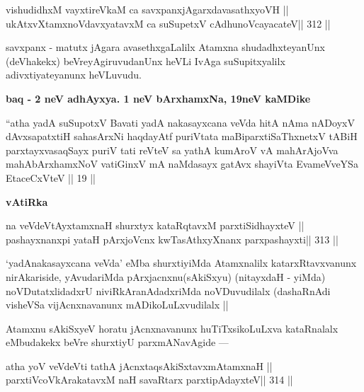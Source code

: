\begin{shl}
vishudidhxM vayxtireVkaM ca savxpanxjAgarxdavasathxyoVH ||
ukAtxvX\s\s tamxnoV\s davxyatavxM ca suSupetxV cAdhunoVcayacateV\hfill || 312 ||
\end{shl}

\begin{artha}
savxpanx - matutx jAgara avasethxgaLalilx Atamxna shudadhxteyanUnx (deVhakekx) beVreyAgiruvudanUnx heVLi IvAga suSupitxyalilx adivxtiyateyanunx heVLuvudu.
\end{artha}

\begin{center}
{\large\bf baq - 2 neV adhAyxya. 1 neV bArxhamxNa, 19neV kaMDike}
\end{center}

\begin{shl}
``atha yadA suSupotxV Bavati yadA nakasayxcana veVda
hitA nAma nADoyxV dAvxsapatxtiH sahasArxNi haqdayAtf
puriVtata maBiparxtiSaThxnetxV tABiH parxtayxvasaqSayx puriV
tati reVteV sa yathA kumAroV vA mahArAjoVva 
mahAbArxhamxNoV va\s tiGinxV mA naMdasayx gatAvx shayiVta 
EvameVveYSa EtaceCxVteV || 19 ||
\end{shl}

\begin{center}
{\large\bf vAtiRka}
\end{center}

\begin{shl}
na veVdeVtAyxtamxnaH shurxtyx kataRqtavxM parxtiSidhayxteV ||
pashayxnanxpi yataH pArxjoVcnx kwTasAthxyXnanx parxpashayxti\hfill || 313 ||
\end{shl}

\begin{artha}
`yadAnakasayxcana veVda' eMba shurxtiyiMda Atamxnalilx katarxRtavxvanunx nirAkariside, yAvudariMda pArxjacnxnu(sAkiSxyu) (nitayxdaH - yiMda) noVDutatxlidadxrU niviRkAranAdadxriMda noVDuvudilalx (dashaRnAdi visheVSa vijAcnxnavanunx mADikoLuLxvudilalx ||
\end{artha}

\begin{artha}
Atamxnu sAkiSxyeV horatu jAcnxnavanunx huTiTxsikoLuLxva kataRnalalx eMbudakekx beVre shurxtiyU parxmANavAgide ---
\end{artha}

\begin{shl}
\footnotemark[1]atha yoV veVdeVti tathA jAcnxtaqsAkiSxtavxmAtamxnaH ||
parxtiVcoV\s kArakatavxM naH savaRtarx parxtipAdayxteV\hfill || 314 ||
\end{shl}


